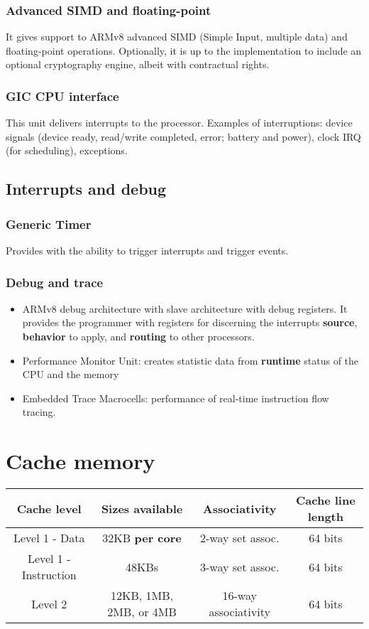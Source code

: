 \subsubsection*{Advanced SIMD and floating-point}
It gives support to ARMv8 advanced SIMD (Simple Input, multiple data) and floating-point operations. Optionally, it is up to the implementation to include an optional cryptography engine, albeit with contractual rights. \cite{cortexA72manual}

\subsubsection*{GIC CPU interface}
This unit delivers interrupts to the processor. Examples of interruptions: device signals (device ready, read/write completed, error; battery and power), clock IRQ (for scheduling), exceptions. \cite{cortexA72manual}

\subsection*{Interrupts and debug}


\subsubsection*{Generic Timer}
Provides with the ability to trigger interrupts and trigger events. \cite{cortexA72manual}

\subsubsection*{Debug and trace}

\begin{itemize}
	\item {ARMv8 debug architecture with slave architecture with debug registers. It provides the programmer with registers for discerning the interrupts \textbf{source}, \textbf{behavior} to apply, and \textbf{routing} to other processors.}
	\item {Performance Monitor Unit: creates statistic data from \textbf{runtime} status of the CPU and the memory}
	\item {Embedded Trace Macrocells: performance of real-time instruction flow tracing.}
	
	\cite{cortexA72manual}
\end{itemize}
\section{Cache memory}
\begin{tabular}{|c|c|c|c|}
	\hline 
	Cache level & Sizes available & Associativity & Cache line length \\ 
	\hline 
	Level 1 - Data & 32KB \textbf{per core} & 2-way set assoc. & 64 bits \\ 
	\hline 
	Level 1 - Instruction & 48KBs & 3-way set assoc. &  64 bits \\ 
	\hline 
	Level 2 & 12KB, 1MB, 2MB, or 4MB & 16-way associativity & 64 bits \\ 
	\hline	
\end{tabular} 


